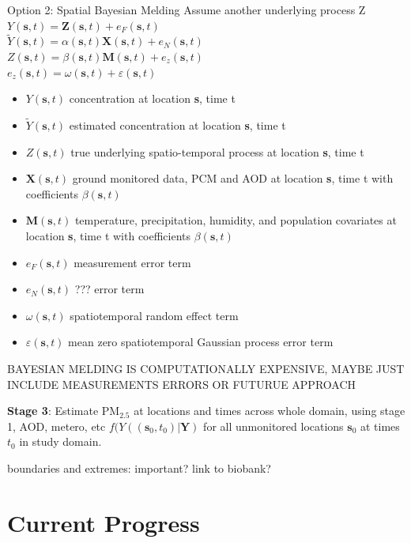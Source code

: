 Option 2: Spatial Bayesian Melding
Assume another underlying process Z \\
$ Y(\textbf{s},t) = \textbf{Z}(\textbf{s},t)  + e_F(\textbf{s},t) $\\
$ \tilde{Y}(\textbf{s},t) = \alpha(\textbf{s},t) \textbf{X}(\textbf{s},t) + e_N(\textbf{s},t) $\\
$ Z(\textbf{s},t) = \beta(\textbf{s},t) \textbf{M}(\textbf{s},t)  + e_z(\textbf{s},t) $\\
$ e_z(\textbf{s},t) = \omega(\textbf{s},t)  + \varepsilon(\textbf{s},t) $ \\
\begin{itemize}
 \item $Y(\textbf{s},t)$ concentration at location \textbf{s}, time t
 \item $\tilde{Y}(\textbf{s},t)$ estimated concentration at location \textbf{s}, time t
 \item $Z(\textbf{s},t)$ true underlying spatio-temporal process at location \textbf{s}, time t
  \item $\textbf{X}(\textbf{s},t)$ ground monitored data, PCM and AOD at location \textbf{s}, time t with coefficients $\beta(\textbf{s},t)$
 \item $\textbf{M}(\textbf{s},t)$ temperature, precipitation, humidity, and population covariates at location \textbf{s}, time t with coefficients $\beta(\textbf{s},t)$
 \item $e_F(\textbf{s},t)$ measurement error term
 \item $e_N(\textbf{s},t)$ ??? error term
 \item $\omega(\textbf{s},t)$ spatiotemporal random effect term
 \item $\varepsilon(\textbf{s},t)$ mean zero spatiotemporal Gaussian process error term
\end{itemize}

BAYESIAN MELDING IS COMPUTATIONALLY EXPENSIVE, MAYBE JUST INCLUDE MEASUREMENTS ERRORS OR FUTURUE APPROACH


\textbf{Stage 3}: Estimate PM$_{2.5}$ at locations and times across whole domain, using stage 1, AOD, metero, etc
$f(Y((\textbf{s}_0,t_0)|\textbf{Y})$
for all unmonitored locations $\textbf{s}_0$ at times $t_0$ in study domain.




boundaries and extremes: important? link to biobank?


\section{Current Progress}

